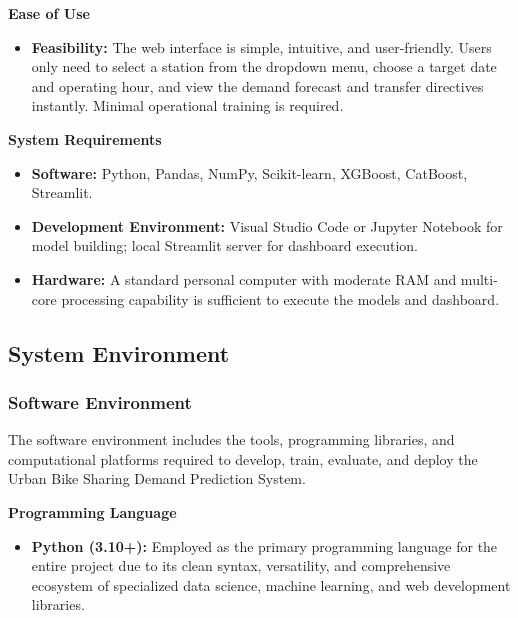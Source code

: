 \documentclass[12pt, a4paper]{article}
\renewcommand{\_}{\textunderscore\allowbreak}
\begin{document}
\noindent \textbf{Ease of Use}
\begin{itemize}
    \item \textbf{Feasibility:} The web interface is simple, intuitive, and user-friendly. Users only need to select a station from the dropdown menu, choose a target date and operating hour, and view the demand forecast and transfer directives instantly. Minimal operational training is required.
\end{itemize}

\noindent \textbf{System Requirements}
\begin{itemize}
    \item \textbf{Software:} Python, Pandas, NumPy, Scikit-learn, XGBoost, CatBoost, Streamlit.
    \item \textbf{Development Environment:} Visual Studio Code or Jupyter Notebook for model building; local Streamlit server for dashboard execution.
    \item \textbf{Hardware:} A standard personal computer with moderate RAM and multi-core processing capability is sufficient to execute the models and dashboard.
\end{itemize}

\subsection{System Environment}

\subsubsection{Software Environment}

The software environment includes the tools, programming libraries, and computational platforms required to develop, train, evaluate, and deploy the Urban Bike Sharing Demand Prediction System.

\noindent \textbf{Programming Language}
\begin{itemize}
    \item \textbf{Python (3.10+):} Employed as the primary programming language for the entire project due to its clean syntax, versatility, and comprehensive ecosystem of specialized data science, machine learning, and web development libraries.
\end{itemize}
\end{document}
